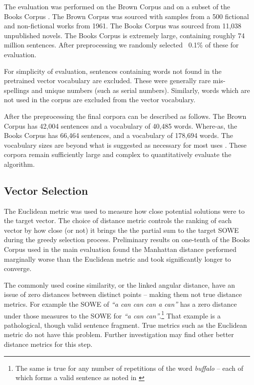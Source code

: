 {The evaluation was performed on the Brown Corpus \parencite{francis1979brown} and on a subset of the Books Corpus \parencite{moviebook}. The Brown Corpus was sourced with samples from a 500 fictional and non-fictional works from 1961. The Books Corpus was sourced from 11,038 unpublished novels. The Books Corpus is extremely large, containing roughly 74 million sentences. After preprocessing we randomly selected ~0.1\% of these for evaluation.

For simplicity of evaluation, sentences containing words not found in the pretrained vector vocabulary are excluded. These were generally rare mis-spellings and unique numbers (such as serial numbers). Similarly, words which are not used in the corpus are excluded from the vector vocabulary. 

After the preprocessing the final corpora can be described as follows. The Brown Corpus has 42,004 sentences and a vocabulary of 40,485 words. Where-as, the Books Corpus has 66,464 sentences, and a vocabulary of 178,694 words. The vocabulary sizes are beyond what is suggested as necessary for most uses \parencite{nation2006large}. These corpora remain sufficiently large and complex to quantitatively evaluate the algorithm.

\subsection{Vector Selection}
The Euclidean metric was used to measure how close potential solutions were to the target vector. The choice of distance metric controls the ranking of each vector by how close (or not) it brings the the partial sum  to the target SOWE during the greedy selection process. Preliminary results on one-tenth of the Books Corpus used in the main evaluation found the Manhattan distance performed marginally worse than the Euclidean metric and took significantly longer to converge.

The commonly used cosine similarity, or the linked angular distance, have an issue of zero distances between distinct points -- making them not true distance metrics. For example the SOWE of \emph{``a can can can a can''} has a zero distance under those measures to the SOWE for \emph{``a can can''}.\footnote{The same is true for any number of repetitions of the word \emph{buffalo} -- each of which forms a valid sentence as noted in \textcite{tymoczko1995sweet}} That example is a pathological, though valid sentence fragment. True metrics such as the Euclidean metric do not have this problem. Further investigation may find other better distance metrics for this step. 


}
